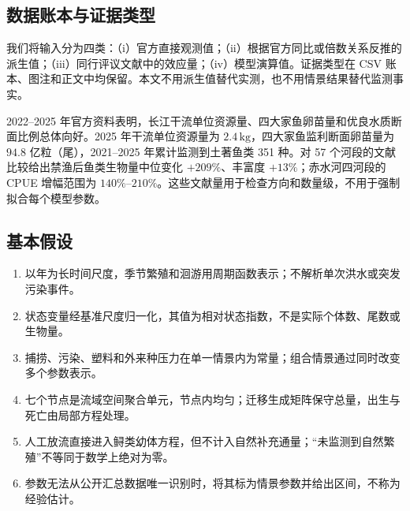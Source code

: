 \documentclass[withoutpreface,bwprint]{cumcmthesis}
\begin{document}
\subsection{数据账本与证据类型}

我们将输入分为四类：（i）官方直接观测值；（ii）根据官方同比或倍数关系反推的派生值；（iii）同行评议文献中的效应量；（iv）模型演算值。证据类型在 CSV 账本、图注和正文中均保留。本文不用派生值替代实测，也不用情景结果替代监测事实。\AIassistmark

2022--2025 年官方资料表明，长江干流单位资源量、四大家鱼卵苗量和优良水质断面比例总体向好\cite{report2022,report2023,report2024,report2025}。2025 年干流单位资源量为 $2.4\,\mathrm{kg}$，四大家鱼监利断面卵苗量为 $94.8$ 亿粒（尾），2021--2025 年累计监测到土著鱼类 351 种\cite{report2025}。对 57 个河段的文献比较给出禁渔后鱼类生物量中位变化 $+209\%$、丰富度 $+13\%$\cite{xiong2026}；赤水河四河段的 CPUE 增幅范围为 $140\%$--$210\%$\cite{liu2023}。这些文献量用于检查方向和数量级，不用于强制拟合每个模型参数。

\subsection{基本假设}

\begin{enumerate}[label=\arabic*.,leftmargin=2.5em]
\item 以年为长时间尺度，季节繁殖和洄游用周期函数表示；不解析单次洪水或突发污染事件。
\item 状态变量经基准尺度归一化，其值为相对状态指数，不是实际个体数、尾数或生物量。
\item 捕捞、污染、塑料和外来种压力在单一情景内为常量；组合情景通过同时改变多个参数表示。
\item 七个节点是流域空间聚合单元，节点内均匀；迁移生成矩阵保守总量，出生与死亡由局部方程处理。
\item 人工放流直接进入鲟类幼体方程，但不计入自然补充通量；“未监测到自然繁殖”不等同于数学上绝对为零。
\item 参数无法从公开汇总数据唯一识别时，将其标为情景参数并给出区间，不称为经验估计。
\end{enumerate}
\end{document}
